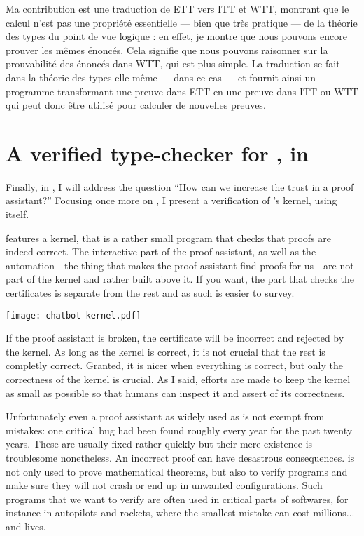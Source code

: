 Ma contribution est une traduction de \acrshort{ETT} vers \acrshort{ITT} et
\acrshort{WTT}, montrant que le calcul n'est pas une propriété essentielle ---
bien que très pratique --- de la théorie des types du point de vue logique : en
effet, je montre que nous pouvons encore prouver les mêmes énoncés.
Cela signifie que nous pouvons raisonner sur la prouvabilité des énoncés dans
\acrshort{WTT}, qui est plus simple.
La traduction se fait dans la théorie des types elle-même --- dans ce cas \Coq
--- et fournit ainsi un programme transformant une preuve dans \acrshort{ETT} en
une preuve dans \acrshort{ITT} ou \acrshort{WTT} qui peut donc être utilisé
pour calculer de nouvelles preuves.

\section{A verified type-checker for \Coq, in \Coq}

Finally, in , I will address the question ``How can we
increase the trust in a proof assistant?'' Focusing once more on \Coq, I present
a verification of \Coq's kernel, using \Coq itself.

\Coq features a kernel, that is a rather small program that checks that proofs
are indeed correct. The interactive part of the proof assistant, as well as the
automation---\ie the thing that makes the proof assistant find proofs for
us---are not part of the kernel and rather built above it.
If you want, the part that checks the certificates is separate from the rest
and as such is easier to survey.

\begin{center}
  \texttt{[image: chatbot-kernel.pdf]}
\end{center}

If the proof assistant is broken, the certificate will be incorrect and rejected
by the kernel. As long as the kernel is correct, it is not crucial that the rest
is completly correct. Granted, it is nicer when everything is correct, but only
the correctness of the kernel is crucial.
As I said, efforts are made to keep the kernel as small as possible so that
humans can inspect it and assert of its correctness.

Unfortunately even a proof assistant as widely used as \Coq is not exempt from
mistakes: one critical bug had been found roughly every year for the past twenty
years. These are usually fixed rather quickly but their mere existence is
troublesome nonetheless.
An incorrect proof can have desastrous consequences. \Coq is not only used to
prove mathematical theorems, but also to verify programs and make sure they will
not crash or end up in unwanted configurations. Such programs that we want to
verify are often used in critical parts of softwares, for instance in autopilots
and rockets, where the smallest mistake can cost millions... and lives.

